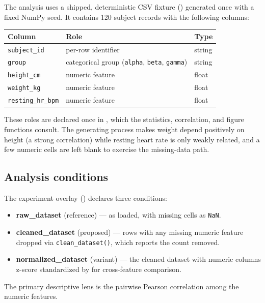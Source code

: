 \documentclass[
]{article}
\newcounter{none} %
\providecommand{\tightlist}{%
  \setlength{\itemsep}{0pt}\setlength{\parskip}{0pt}}
\begin{document}
The analysis uses a shipped, deterministic CSV fixture
() generated once with a fixed NumPy seed.
It contains 120 subject records with the following columns:

{\def\LTcaptype{none} %
\begin{longtable}[]{@{}lll@{}}
\toprule\noalign{}
Column & Role & Type \\
\midrule\noalign{}
\endhead
\bottomrule\noalign{}
\endlastfoot
\texttt{subject\_id} & per-row identifier & string \\
\texttt{group} & categorical group (\texttt{alpha}, \texttt{beta},
\texttt{gamma}) & string \\
\texttt{height\_cm} & numeric feature & float \\
\texttt{weight\_kg} & numeric feature & float \\
\texttt{resting\_hr\_bpm} & numeric feature & float \\
\end{longtable}
}

These roles are declared once in
, which the statistics,
correlation, and figure functions consult. The generating process makes
weight depend positively on height (a strong correlation) while resting
heart rate is only weakly related, and a few numeric cells are left
blank to exercise the missing-data path.

\subsection{Analysis conditions}\label{analysis-conditions}

The experiment overlay () declares three
conditions:

\begin{itemize}
\tightlist
\item
  \textbf{raw\_dataset} (reference) --- as loaded, with missing cells as
  \texttt{NaN}.
\item
  \textbf{cleaned\_dataset} (proposed) --- rows with any missing numeric
  feature dropped via \texttt{clean\_dataset()}, which reports the count
  removed.
\item
  \textbf{normalized\_dataset} (variant) --- the cleaned dataset with
  numeric columns z-score standardized by 
  for cross-feature comparison.
\end{itemize}

The primary descriptive lens is the pairwise Pearson correlation among
the numeric features.
\end{document}
